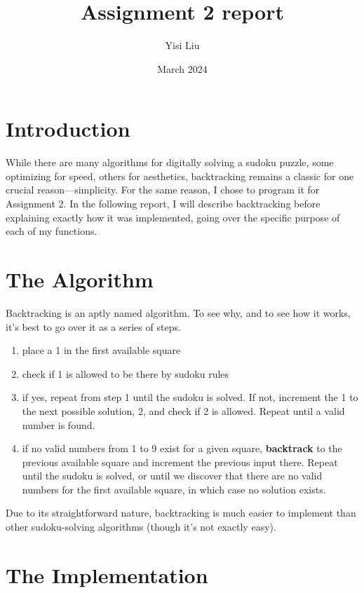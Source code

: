 \documentclass{article}
\title{Assignment 2 report}
\author{Yisi Liu}
\date{March 2024}
\begin{document}
\maketitle

\section{Introduction}

While there are many algorithms for digitally solving a sudoku puzzle, some optimizing for speed, others for aesthetics, backtracking remains a classic for one crucial reason—simplicity. For the same reason, I chose to program it for Assignment 2. In the following report, I will describe backtracking before explaining exactly how it was implemented, going over the specific purpose of each of my functions. 

\section{The Algorithm}

Backtracking is an aptly named algorithm. To see why, and to see how it works, it's best to go over it as a series of steps. 

\begin{enumerate}
    \item place a 1 in the first available square
    \item check if 1 is allowed to be there by sudoku rules
    \item if yes, repeat from step 1 until the sudoku is solved. If not, increment the 1 to the next possible solution, 2, and check if 2 is allowed. Repeat until a valid number is found. 
    \item if no valid numbers from 1 to 9 exist for a given square, \textbf{backtrack} to the previous available square and increment the previous input there. Repeat until the sudoku is solved, or until we discover that there are no valid numbers for the first available square, in which case no solution exists.

\end{enumerate}

Due to its straightforward nature, backtracking is much easier to implement than other sudoku-solving algorithms (though it's not exactly easy). 

\section{The Implementation}
\end{document}
